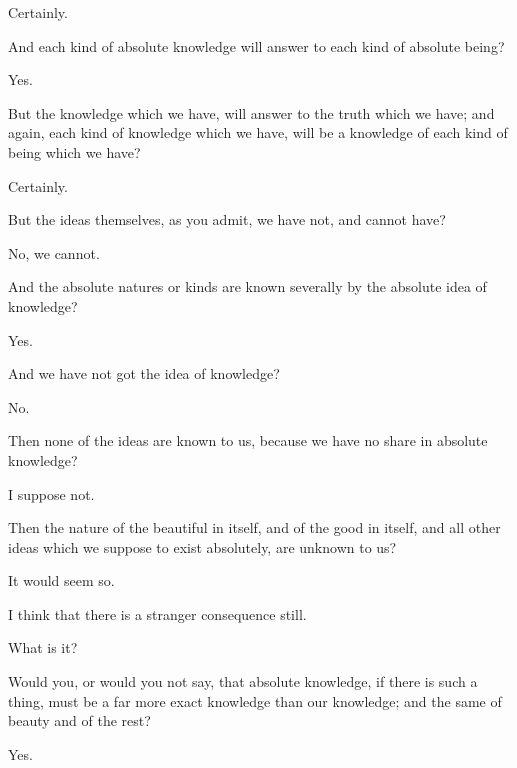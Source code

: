 \documentclass[11pt,letter]{article}
\begin{document}
\par  Certainly.

\par  And each kind of absolute knowledge will answer to each kind of absolute being?

\par  Yes.

\par  But the knowledge which we have, will answer to the truth which we have; and again, each kind of knowledge which we have, will be a knowledge of each kind of being which we have?

\par  Certainly.

\par  But the ideas themselves, as you admit, we have not, and cannot have?

\par  No, we cannot.

\par  And the absolute natures or kinds are known severally by the absolute idea of knowledge?

\par  Yes.

\par  And we have not got the idea of knowledge?

\par  No.

\par  Then none of the ideas are known to us, because we have no share in absolute knowledge?

\par  I suppose not.

\par  Then the nature of the beautiful in itself, and of the good in itself, and all other ideas which we suppose to exist absolutely, are unknown to us?

\par  It would seem so.

\par  I think that there is a stranger consequence still.

\par  What is it?

\par  Would you, or would you not say, that absolute knowledge, if there is such a thing, must be a far more exact knowledge than our knowledge; and the same of beauty and of the rest?

\par  Yes.
\end{document}
